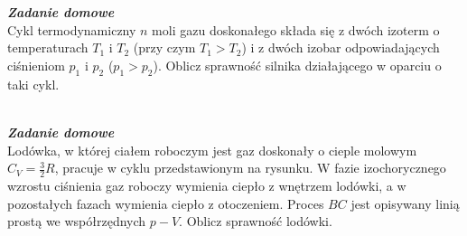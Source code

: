 \documentclass[11pt,a4paper]{article}
\newcounter{zaddom}\newcommand{\zaddom}[1][]{\addtocounter{zaddom}{1} ~\\  {\bf \emph{Zadanie domowe \arabic{zaddom} #1 }} \\}
\begin{document}
\pagebreak
~
\zaddom
Cykl termodynamiczny $n$ moli gazu doskonałego składa się z dwóch izoterm o temperaturach $T_1$ i $T_2$
 (przy czym $T_1 > T_2$) i z dwóch izobar odpowiadających ciśnieniom $p_1$ i $p_2$ ($p_1 > p_2$).
 Oblicz sprawność silnika działającego w oparciu o taki cykl.

\begin{figure}\vspace{-5mm}
\end{figure}
\zaddom
Lodówka, w której ciałem roboczym jest gaz doskonały
o cieple molowym $C_V=\frac{3}{2} R$, pracuje w cyklu przedstawionym na rysunku.
W fazie izochorycznego wzrostu ciśnienia gaz roboczy wymienia ciepło
z wnętrzem lodówki, a w pozostałych fazach wymienia ciepło z otoczeniem.
Proces $BC$ jest opisywany linią prostą we współrzędnych $p-V$.
Oblicz sprawność lodówki.
\end{document}
